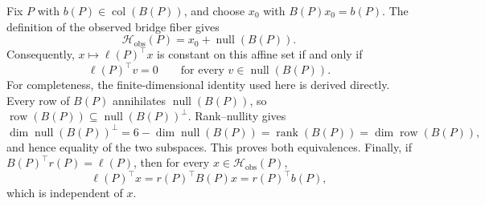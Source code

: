 Fix \(P\) with \(b(P)\in\operatorname{col}(B(P))\), and choose
\(x_0\) with \(B(P)x_0=b(P)\).  The definition of the observed bridge fiber gives
\[
 \mathcal H_{\mathrm{obs}}(P)=x_0+\operatorname{null}(B(P)).
\]
Consequently, \(x\mapsto\ell(P)^\top x\) is constant on this affine set if and
only if
\[
 \ell(P)^\top v=0\qquad\text{for every }v\in\operatorname{null}(B(P)).
\]
For completeness, the finite-dimensional identity used here is derived directly.
Every row of \(B(P)\) annihilates \(\operatorname{null}(B(P))\), so
\(\operatorname{row}(B(P))\subseteq\operatorname{null}(B(P))^\perp\).  Rank--nullity
gives
\[
 \dim\operatorname{null}(B(P))^\perp
 =6-\dim\operatorname{null}(B(P))
 =\operatorname{rank}(B(P))
 =\dim\operatorname{row}(B(P)),
\]
and hence equality of the two subspaces.  This proves both equivalences.  Finally,
if \(B(P)^\top r(P)=\ell(P)\), then for every
\(x\in\mathcal H_{\mathrm{obs}}(P)\),
\[
 \ell(P)^\top x=r(P)^\top B(P)x=r(P)^\top b(P),
\]
which is independent of \(x\).